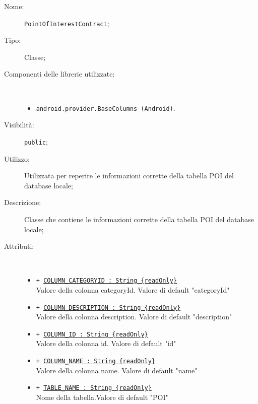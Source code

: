 \documentclass[../DefinizioneDiProdotto.tex]{subfiles}
\begin{document}
\begin{description}
	\item[Nome:] \texttt{PointOfInterestContract};
	\item[Tipo:] Classe;
	\item[Componenti delle librerie utilizzate:] \
	\begin{itemize}
		\item \texttt{android.provider.BaseColumns (Android)}.
		
	\end{itemize}
	\item[Visibilità:] \texttt{public};
	\item[Utilizzo:] Utilizzata per reperire le informazioni corrette della tabella POI del database locale;
	\item[Descrizione:] Classe che contiene le informazioni corrette della tabella POI del database locale;
	\item[Attributi:] \
	\begin{itemize}
		\item \texttt{+ \underline{COLUMN\_CATEGORYID : String \{readOnly\}}}\\
		Valore della colonna categoryId. Valore di default "categoryId"
		
		\item \texttt{+ \underline{COLUMN\_DESCRIPTION : String \{readOnly\}}}\\
		Valore della colonna description. Valore di default "description"
		
		\item \texttt{+ \underline{COLUMN\_ID : String \{readOnly\}}}\\
		Valore della colonna id. Valore di default "id"
		
		\item \texttt{+ \underline{COLUMN\_NAME : String \{readOnly\}}}\\
		Valore della colonna name. Valore di default "name"
		
		\item \texttt{+ \underline{TABLE\_NAME : String \{readOnly\}}}\\
		Nome della tabella.Valore di default "POI"
		
	\end{itemize}
\end{description}
\end{document}
